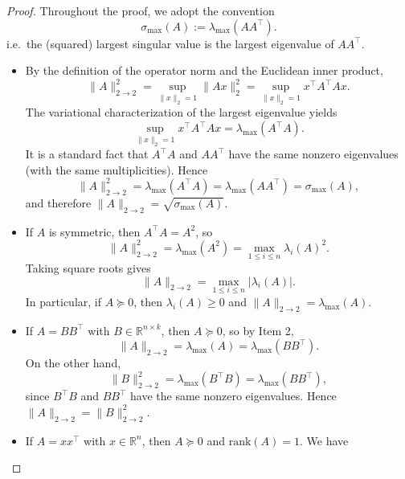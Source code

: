\documentclass[12pt]{article}
\renewcommand{\(}{\left(}%
\renewcommand{\)}{\right)}%
\renewcommand{\[}{\left[}%
\renewcommand{\]}{\right]}%
\newtheorem{proof}{Proof.}}
\begin{document}
\begin{proof}
Throughout the proof, we adopt the convention
\begin{equation*}
\sigma_{\max}(A):=\lambda_{\max}(AA^\top).
\end{equation*}
i.e.\ the (squared) largest singular value is the largest eigenvalue of $AA^\top$.
\begin{itemize}
	\item By the definition of the operator norm and the Euclidean inner product,
\begin{equation*}
\|A\|_{2\to 2}^2=\sup_{\|x\|_2=1}\|Ax\|_2^2=\sup_{\|x\|_2=1} x^\top A^\top A x.
\end{equation*}
The variational characterization of the largest eigenvalue yields
\begin{equation*}
\sup_{\|x\|_2=1} x^\top A^\top A x=\lambda_{\max}(A^\top A).
\end{equation*}
It is a standard fact that $A^\top A$ and $AA^\top$ have the same nonzero eigenvalues (with the same multiplicities). Hence
\begin{equation*}
\|A\|_{2\to 2}^2=\lambda_{\max}(A^\top A)=\lambda_{\max}(AA^\top)=\sigma_{\max}(A),
\end{equation*}
and therefore $\|A\|_{2\to 2}=\sqrt{\sigma_{\max}(A)}$.
	\item If $A$ is symmetric, then $A^\top A=A^2$, so
\begin{equation*}
\|A\|_{2\to 2}^2=\lambda_{\max}(A^2)=\max_{1\le i\le n}\lambda_i(A)^2.
\end{equation*}
Taking square roots gives
\begin{equation*}
\|A\|_{2\to 2}=\max_{1\le i\le n}|\lambda_i(A)|.
\end{equation*}
In particular, if $A\succeq 0$, then $\lambda_i(A)\ge 0$ and $\|A\|_{2\to 2}=\lambda_{\max}(A)$.
	\item If $A=BB^\top$ with $B\in\mathbb{R}^{n\times k}$, then $A\succeq 0$, so by Item 2,
\begin{equation*}
\|A\|_{2\to 2}=\lambda_{\max}(A)=\lambda_{\max}(BB^\top).
\end{equation*}
On the other hand,
\begin{equation*}
\|B\|_{2\to 2}^2=\lambda_{\max}(B^\top B)=\lambda_{\max}(BB^\top),
\end{equation*}
since $B^\top B$ and $BB^\top$ have the same nonzero eigenvalues. Hence $\|A\|_{2\to 2}=\|B\|_{2\to 2}^2$.
	\item If $A=xx^\top$ with $x\in\mathbb{R}^n$, then $A\succeq 0$ and $\mathrm{rank}(A)=1$. We have

\end{itemize}
\end{proof}
\end{document}
